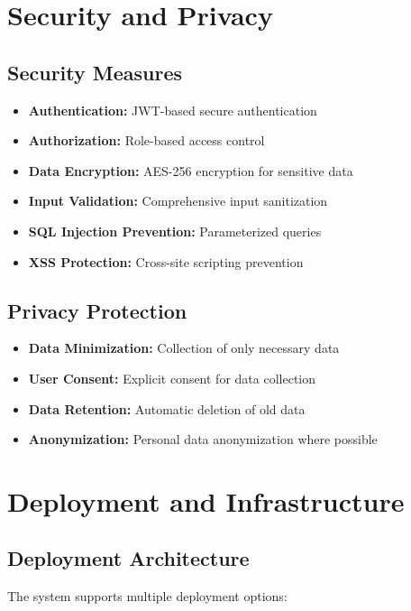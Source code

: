 \documentclass[12pt,a4paper]{article}
\begin{document}
\section{Security and Privacy}

\subsection{Security Measures}

\begin{itemize}
    \item \textbf{Authentication:} JWT-based secure authentication
    \item \textbf{Authorization:} Role-based access control
    \item \textbf{Data Encryption:} AES-256 encryption for sensitive data
    \item \textbf{Input Validation:} Comprehensive input sanitization
    \item \textbf{SQL Injection Prevention:} Parameterized queries
    \item \textbf{XSS Protection:} Cross-site scripting prevention
\end{itemize}

\subsection{Privacy Protection}

\begin{itemize}
    \item \textbf{Data Minimization:} Collection of only necessary data
    \item \textbf{User Consent:} Explicit consent for data collection
    \item \textbf{Data Retention:} Automatic deletion of old data
    \item \textbf{Anonymization:} Personal data anonymization where possible
\end{itemize}

\section{Deployment and Infrastructure}

\subsection{Deployment Architecture}

The system supports multiple deployment options:
\end{document}
